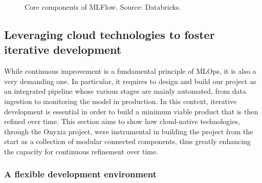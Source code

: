 \begin{figure}[htbp]
    \centering
    \caption{Core components of MLFlow. Source: Databricks.}
    \label{fig:mlflow-components}
\end{figure}






\subsection{Leveraging cloud technologies to foster iterative development}

While continuous improvement is a fundamental principle of MLOps, it is also a very demanding one. In particular, it requires to design and build our project as an integrated pipeline whose various stages are mainly automated, from data ingestion to monitoring the model in production. In this context, iterative development is essential in order to build a minimum viable product that is then refined over time. This section aims to show how cloud-native technologies, through the Onyxia project, were instrumental in building the project from the start as a collection of modular connected components, thus greatly enhancing the capacity for continuous refinement over time.

\subsubsection{A flexible development environment}

